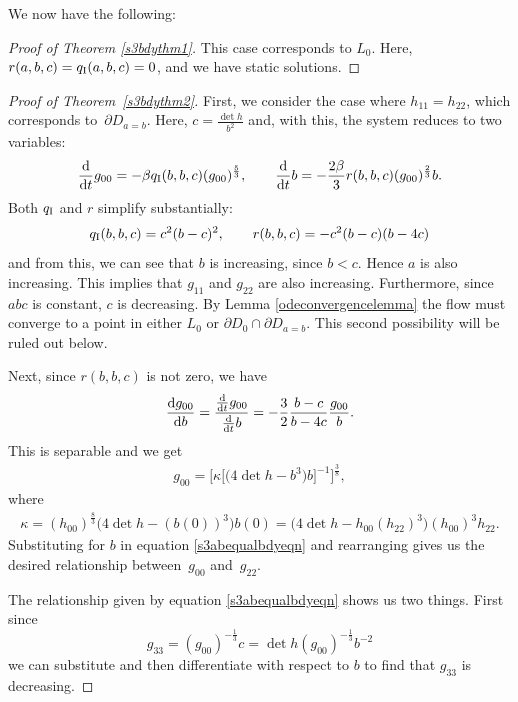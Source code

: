 \documentclass[pdftex]{sigma}
\numberwithin{equation}{section}
\newcommand{\dtime}{\frac{{\rm d}}{{\rm d} t}} %
\begin{document}
We now have the following:

\begin{proof}[Proof of Theorem \ref{s3bdythm1}]
This case corresponds to $L_0$. Here, $r(a, b, c) = q_{\rm I}(a, b, c) = 0$, and we have static solutions.
\end{proof}

\begin{proof}[Proof of Theorem~\ref{s3bdythm2}]
First, we consider the case where $h_{11} = h_{22}$, which corresponds to~$\partial D_{a = b}$. Here, $c = \frac{\det h}{b^2}$ and, with this, the system reduces to two variables:
\begin{gather*}
\dtime g_{00} = - \beta q_{\rm I}(b, b, c) (g_{00})^{\frac{5}{3}},\qquad
\dtime b = - \frac{2 \beta}{3} r(b, b, c) (g_{00})^{\frac{2}{3}} b.
\end{gather*}
Both $q_{\rm I}$ and $r$ simplify substantially:
\begin{gather*}
q_{\rm I}(b, b, c) = c^2 (b - c)^2,\qquad
r(b, b, c) = -c^2 (b - c) (b - 4c)
\end{gather*}
and from this, we can see that $b$ is increasing, since $b < c$. Hence $a$ is also increasing. This implies that $g_{11}$ and $g_{22}$ are also increasing. Furthermore, since $abc$ is constant, $c$ is decreasing. By Lemma \ref{odeconvergencelemma} the flow must converge to a point in either $L_0$ or $\partial D_0 \cap \partial D_{a=b}$. This second possibility will be ruled out below.

Next, since $r(b, b, c)$ is not zero, we have
\begin{equation*}
\frac{{\rm d} g_{00}}{{\rm d} b} = \frac{\dtime g_{00}}{\dtime b}
				= -\frac{3}{2} \frac{b - c}{b - 4c} \frac{g_{00}}{b}.
\end{equation*}
This is separable and we get
\begin{gather} \label{s3abequalbdyeqn}
g_{00} = \bigl[\kappa \bigl[\big(4 \det h - b^3\big) b \bigr]^{-1} \bigr]^{\frac{3}{8}},
\end{gather}
where
\begin{gather*}
\kappa = (h_{00})^{\frac{8}{3}} \big(4 \det h - (b(0))^3\big) b(0)
	 = \big(4 \det h - h_{00} (h_{22})^3\big) (h_{00})^3 h_{22}.
\end{gather*}
Substituting for $b$ in equation \eqref{s3abequalbdyeqn} and rearranging gives us the desired relationship between~$g_{00}$ and~$g_{22}$.

The relationship given by equation \eqref{s3abequalbdyeqn} shows us two things. First since
\[
g_{33} = (g_{00})^{-\frac{1}{3}} c = \det h (g_{00})^{-\frac{1}{3}}b^{-2}
\]
we can substitute and then differentiate with respect to $b$ to find that $g_{33}$ is decreasing.


\end{proof}
\end{document}
